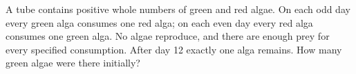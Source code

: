 A tube contains positive whole numbers of green and red algae. On each odd day every green alga consumes one red alga; on each even day every red alga consumes one green alga. No algae reproduce, and there are enough prey for every specified consumption. After day 12 exactly one alga remains. How many green algae were there initially?
